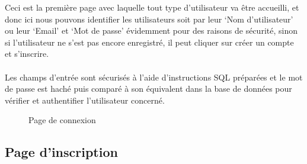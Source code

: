 \documentclass[12pt]{report}
\begin{document}
\vspace{0.2in}

Ceci est la première page avec laquelle tout type d'utilisateur va être accueilli, et donc ici nous pouvons identifier les utilisateurs soit par leur `Nom d'utilisateur' ou leur `Email' et `Mot de passe' évidemment pour des raisons de sécurité, sinon si l'utilisateur ne s'est pas encore enregistré, il peut cliquer sur créer un compte et s'inscrire.
\\\\
Les champs d'entrée sont sécurisés à l'aide d'instructions SQL préparées et le mot de passe est haché puis comparé à son équivalent dans la base de données pour vérifier et authentifier l'utilisateur concerné.

\vspace{0.8in}

\begin{figure}[h]
\centering
\caption{Page de connexion}
\end{figure}

\newpage

\subsection{Page d'inscription}

\vspace{0.2in}
\end{document}
